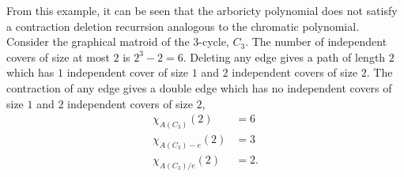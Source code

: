 \documentclass[12pt,reqno]{amsart}
\numberwithin{definition}{section}
\theoremstyle{definition}
\newtheorem{example}[definition]{Example}
\begin{document}
From this example, it can be seen that the arboricty polynomial does
not satisfy a contraction deletion recurrsion analogous to the chromatic polynomial.  Consider the graphical matroid of the $3$-cycle, $C_3$.  The number of independent covers of size at most $2$ is $2^3-2 = 6$.    Deleting any edge gives a path of length $2$ which has $1$ independent cover of size $1$ and $2$ independent covers of size $2$.  The contraction of any edge gives a double edge which has no independent covers of size $1$ and $2$ independent covers of size $2$,  
\begin{align*}
\chi_{A(C_3)}(2) &= 6 \\
\chi_{A(C_3)-e}(2) &= 3 \\
\chi_{A(C_3) / e }(2)  &= 2.
\end{align*}









\end{document}
